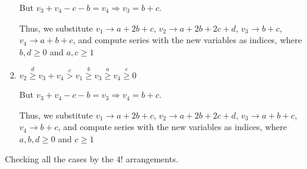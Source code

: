 \documentclass{article}
\begin{document}
\begin{enumerate}
But $v_3+v_4-c-b=v_4\Rightarrow{v_3=b+c}.$

Thus, we substitute $v_1\rightarrow{a+2b+c}$, $v_2\rightarrow{a+2b+2c+d}$, $v_3\rightarrow{b+c}$, $v_4\rightarrow{a+b+c}$, and compute series with the new variables as indices, where $b,d\geq{0}$ and $a,c\geq{1}$
    \item 
$v_2\overset{d}{\geq}v_3+v_4\overset{c}{>}v_1\overset{b}{\geq}{v_3}\overset{a}{\geq}v_4\overset{e}{\geq}{0}$

But $v_3+v_4-c-b=v_3\Rightarrow{v_4=b+c}.$

Thus, we substitute $v_1\rightarrow{a+2b+c}$, $v_2\rightarrow{a+2b+2c+d}$, $v_3\rightarrow{a+b+c}$, $v_4\rightarrow{b+c}$, and compute series with the new variables as indices, where $a,b,d\geq{0}$ and $c\geq{1}$
\end{enumerate}

Checking all the cases by the $4!$ arrangements.
\end{document}
